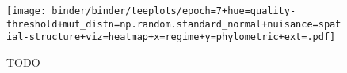 \begin{figure*}
  \centering
  \texttt{[image: binder/binder/teeplots/epoch=7+hue=quality-threshold+mut\_distn=np.random.standard\_normal+nuisance=spatial-structure+viz=heatmap+x=regime+y=phylometric+ext=.pdf]}
  \caption{TODO}
  \label{fig:reconstructed-tree-phylometrics-error-spatial-nuisance}
\end{figure*}
